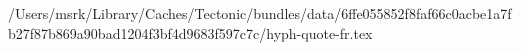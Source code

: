 /Users/msrk/Library/Caches/Tectonic/bundles/data/6ffe055852f8faf66c0acbe1a7fb27f87b869a90bad1204f3bf4d9683f597c7c/hyph-quote-fr.tex